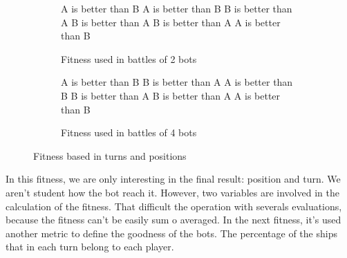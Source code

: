\documentclass{llncs}
\begin{document}
\begin{figure}[h]
\tiny
\begin{subfigure}[!]{0.5\textwidth}
\begin{algorithmic}
                \State A is better than B
                \State A is better than B
            \Else
                \State B is better than A
            \EndIf
        \Else
                \State B is better than A
                \State B is better than A
            \Else
                \State A is better than B
            \EndIf
        \EndIf
        \end{algorithmic}
        \label{fig:fitness_turns_positions:2}
\caption{Fitness used in battles of 2 bots}
\end{subfigure}
\begin{subfigure}[!]{0.5\textwidth}
    \begin{algorithmic}
            \State A is better than B
            \State B is better than A
        \Else
                    \State A is better than B
                \Else
                    \State B is better than A
                \EndIf
            \Else
                    \State B is better than A
                \Else
                    \State A is better than B
                \EndIf
            \EndIf
        \EndIf
    \end{algorithmic}
    \label{fig:fitness_turns_positions:co}
\caption{Fitness used in battles of 4 bots}
\end{subfigure}
\label{fig:fitness_turns_positions}
\caption{Fitness based in turns and positions}
\end{figure}

In this fitness, we are only interesting in the final result: position and turn. We aren't student how the bot reach it. However, two variables are involved in the calculation of the fitness. That difficult the operation with severals evaluations, because the fitness can't be easily sum o averaged. In the next fitness, it's used another metric to define the goodness of the bots. The percentage of the ships that in each turn belong to each player. 
\end{document}
